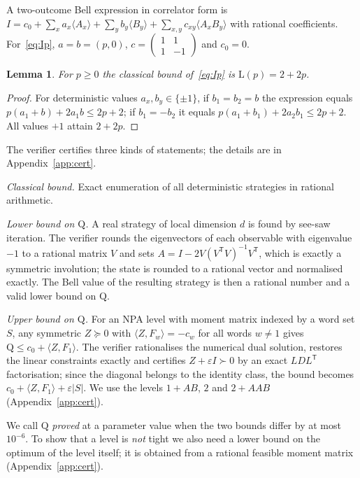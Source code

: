 \documentclass[10pt,twocolumn,a4paper]{article}
\newtheorem{lemma}[theorem]{Lemma}
\theoremstyle{definition}
\theoremstyle{remark}
\newcommand{\Q}{\mathrm{Q}}
\newcommand{\Lc}{\mathrm{L}}
\newcommand{\ev}[1]{\langle #1\rangle}
\begin{document}
A two-outcome Bell expression in correlator form is
$I = c_0 + \sum_x a_x\ev{A_x} + \sum_y b_y\ev{B_y} + \sum_{x,y} c_{xy}\ev{A_xB_y}$ with rational coefficients. For~\eqref{eq:Ip},
$a=b=(p,0)$, $c=\left(\begin{smallmatrix}1&1\\1&-1\end{smallmatrix}\right)$ and $c_0=0$.

\begin{lemma}\label{lem:L}
For $p\ge 0$ the classical bound of~\eqref{eq:Ip} is $\Lc(p)=2+2p$.
\end{lemma}
\begin{proof}
For deterministic values $a_x,b_y\in\{\pm1\}$, if $b_1=b_2=b$ the expression equals $p(a_1+b)+2a_1b\le 2p+2$; if $b_1=-b_2$ it
equals $p(a_1+b_1)+2a_2b_1\le 2p+2$. All values $+1$ attain $2+2p$.
\end{proof}

The verifier certifies three kinds of statements; the details are in Appendix~\ref{app:cert}.

\emph{Classical bound.} Exact enumeration of all deterministic strategies in rational arithmetic.

\emph{Lower bound on $\Q$.} A real strategy of local dimension $d$ is found by see-saw iteration. The verifier rounds the
eigenvectors of each observable with eigenvalue $-1$ to a rational matrix $V$ and sets $A=I-2V(V^{\mathsf T}V)^{-1}V^{\mathsf T}$,
which is exactly a symmetric involution; the state is rounded to a rational vector and normalised exactly. The Bell value of the
resulting strategy is then a rational number and a valid lower bound on $\Q$.

\emph{Upper bound on $\Q$.} For an NPA level with moment matrix indexed by a word set $S$, any symmetric $Z\succeq0$ with
$\langle Z,F_w\rangle=-c_w$ for all words $w\ne 1$ gives $\Q\le c_0+\langle Z,F_1\rangle$. The verifier rationalises the
numerical dual solution, restores the linear constraints exactly and certifies $Z+\varepsilon I\succ0$ by an exact
$LDL^{\mathsf T}$ factorisation; since the diagonal belongs to the identity class, the bound becomes
$c_0+\langle Z,F_1\rangle+\varepsilon|S|$. We use the levels $1{+}AB$, $2$ and $2{+}AAB$ (Appendix~\ref{app:cert}).

We call $\Q$ \emph{proved} at a parameter value when the two bounds differ by at most $10^{-6}$. To show that a level is
\emph{not} tight we also need a lower bound on the optimum of the level itself; it is obtained from a rational feasible moment
matrix (Appendix~\ref{app:cert}).
\end{document}
